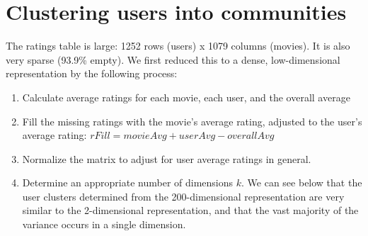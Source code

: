 \documentclass[11pt]{article}
\begin{document}
\section{Clustering users into communities}

The ratings table is large: 1252 rows (users) x 1079 columns (movies). It is also very sparse (93.9\% empty). We first reduced this to a dense, low-dimensional representation by the following process:
\begin{enumerate}
    \item Calculate average ratings for each movie, each user, and the overall average
    \item Fill the missing ratings with the movie's average rating, adjusted to the user's average rating: $rFill = movieAvg + userAvg - overallAvg$
    \item Normalize the matrix to adjust for user average ratings in general.
    \item Determine an appropriate number of dimensions $k$. We can see below that the user clusters determined from the 200-dimensional representation are very similar to the 2-dimensional representation, and that the vast majority of the variance occurs in a single dimension.
\end{enumerate}
\end{document}
